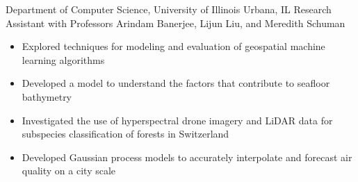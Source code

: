 
        {Department of Computer Science, University of Illinois}
        {Urbana, IL}
        {Research Assistant}
        {with Professors Arindam Banerjee, Lijun Liu, and Meredith Schuman}{
    \begin{itemize}
        \item Explored techniques for modeling and evaluation of geospatial machine learning algorithms
        \item Developed a model to understand the factors that contribute to seafloor bathymetry
        \item Investigated the use of hyperspectral drone imagery and LiDAR data for subspecies classification of forests in Switzerland
        \item Developed Gaussian process models to accurately interpolate and forecast air quality on a city scale
    \end{itemize}
}
